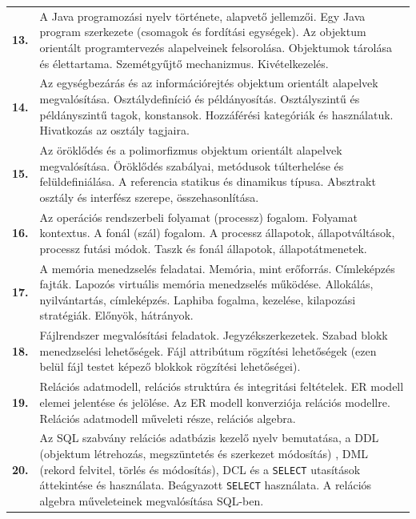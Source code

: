 \documentclass[a4paper,12pt]{article}
\newcommand{\code}[1]{\texttt{#1}}
\begin{document}
\begin{tabular}{|lp{16.5cm}|}

\hline

\textbf{13.} &
A Java programozási nyelv története, alapvető jellemzői. Egy Java program szerkezete (csomagok és fordítási egységek). Az objektum orientált programtervezés alapelveinek felsorolása. Objektumok tárolása és élettartama. Szemétgyűjtő mechanizmus. Kivételkezelés.
\\

\textbf{14.} &
Az egységbezárás és az információrejtés objektum orientált alapelvek megvalósítása. Osztálydefiníció és példányosítás. Osztályszintű és példányszintű tagok, konstansok. Hozzáférési kategóriák és használatuk. Hivatkozás az osztály tagjaira.
\\

\textbf{15.} &
Az öröklődés és a polimorfizmus objektum orientált alapelvek megvalósítása. Öröklődés szabályai, metódusok túlterhelése és felüldefiniálása. A referencia statikus és dinamikus típusa. Absztrakt osztály és interfész szerepe, összehasonlítása.
\\

\hline

\textbf{16.} &
Az operációs rendszerbeli folyamat (processz) fogalom. Folyamat kontextus. A fonál (szál) fogalom. A processz állapotok, állapotváltások, processz futási módok. Taszk és fonál állapotok, állapotátmenetek.
\\

\textbf{17.} &
A memória menedzselés feladatai. Memória, mint erőforrás. Címleképzés fajták. Lapozós virtuális memória menedzselés működése. Allokálás, nyilvántartás, címleképzés. Laphiba fogalma, kezelése, kilapozási stratégiák. Előnyök, hátrányok.
\\

\textbf{18.} &
Fájlrendszer megvalósítási feladatok. Jegyzékszerkezetek. Szabad blokk menedzselési lehetőségek. Fájl attribútum rögzítési lehetőségek (ezen belül fájl testet képező blokkok rögzítési lehetőségei).
\\

\hline

\textbf{19.} &
Relációs adatmodell, relációs struktúra és integritási feltételek. ER modell elemei jelentése és jelölése. Az ER modell konverziója relációs modellre. Relációs adatmodell műveleti része, relációs algebra.
\\

\textbf{20.} &
Az SQL szabvány relációs adatbázis kezelő nyelv bemutatása, a DDL (objektum létrehozás, megszüntetés és szerkezet módosítás) , DML (rekord felvitel, törlés és módosítás), DCL és a \code{SELECT} utasítások áttekintése és használata. Beágyazott \code{SELECT} használata. A relációs algebra műveleteinek megvalósítása SQL-ben.
\\


\end{tabular}
\end{document}
